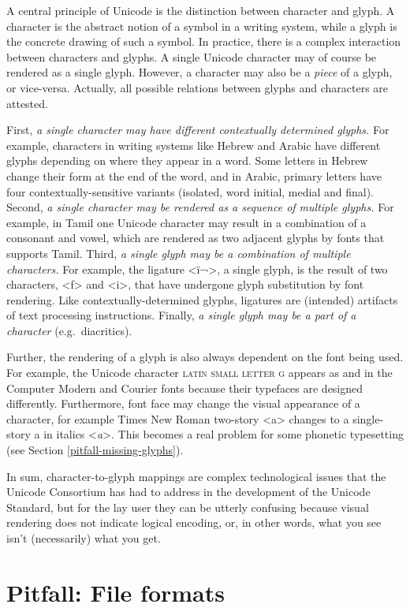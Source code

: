 A central principle of Unicode is the distinction between character and glyph. A character is the abstract notion of a symbol in a writing system, while a glyph is the concrete drawing of such a symbol. In practice, there is a complex interaction between characters and glyphs. A single Unicode character may of course be rendered as a single glyph. However, a character may also be a \textit{piece} of a glyph, or vice-versa. Actually, all possible relations between glyphs and characters are attested.

First, \textit{a single character may have different contextually determined glyphs.} For example, characters in writing systems like Hebrew and Arabic have different glyphs depending on where they appear in a word. Some letters in Hebrew change their form at the end of the word, and in Arabic, primary letters have four contextually-sensitive variants (isolated, word initial, medial and final). Second, \textit{a single character may be rendered as a sequence of multiple glyphs.} For example, in Tamil one Unicode character may result in a combination of a consonant and vowel, which are rendered as two adjacent glyphs by fonts that supports Tamil. Third, \textit{a single glyph may be a combination of multiple characters.} For example, the ligature <ï¬>, a single glyph, is the result of two characters, <f> and <i>, that have undergone glyph substitution by font rendering. Like contextually-determined glyphs, ligatures are (intended) artifacts of text processing instructions. Finally, \textit{a single glyph may be a part of a character} (e.g.~diacritics).

Further, the rendering of a glyph is also always dependent on the font being used. For example, the Unicode character \textsc{latin small letter g} appears as and in the Computer Modern and Courier fonts because their typefaces are designed differently. Furthermore, font face may change the visual appearance of a character, for example Times New Roman two-story <a> changes to a single-story a in italics <\emph{a}>. This becomes a real problem for some phonetic typesetting (see Section \ref{pitfall-missing-glyphs}).

In sum, character-to-glyph mappings are complex technological issues that the Unicode Consortium has had to address in the development of the Unicode Standard, but for the lay user they can be utterly confusing because visual rendering does not indicate logical encoding, or, in other words, what you see isn't (necessarily) what you get.

\section{Pitfall: File formats}
\label{pitfall-file-formats}


